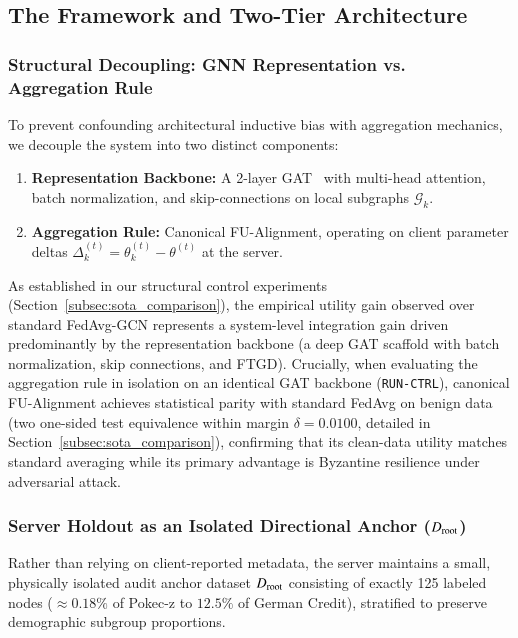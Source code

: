 \subsection{The \MethodName{} Framework and Two-Tier Architecture}
\label{subsec:framework}

\subsubsection{Structural Decoupling: GNN Representation vs. Aggregation Rule}
To prevent confounding architectural inductive bias with aggregation mechanics, we decouple the system into two distinct components:
\begin{enumerate}[leftmargin=*]
    \item \textbf{Representation Backbone:} A 2-layer GAT~\citep{velickovic2017graph} with multi-head attention, batch normalization, and skip-connections on local subgraphs $\mathcal{G}_k$.
    \item \textbf{Aggregation Rule:} Canonical FU-Alignment, operating on client parameter deltas $\Delta_k^{(t)} = \theta_k^{(t)} - \theta^{(t)}$ at the server.
\end{enumerate}
As established in our structural control experiments (Section~\ref{subsec:sota_comparison}), the empirical utility gain observed over standard FedAvg-GCN represents a system-level integration gain driven predominantly by the representation backbone (a deep GAT scaffold with batch normalization, skip connections, and FTGD). Crucially, when evaluating the aggregation rule in isolation on an identical GAT backbone (\texttt{RUN-CTRL}), canonical FU-Alignment achieves statistical parity with standard FedAvg on benign data (two one-sided test equivalence within margin $\delta = 0.0100$, detailed in Section~\ref{subsec:sota_comparison}), confirming that its clean-data utility matches standard averaging while its primary advantage is Byzantine resilience under adversarial attack.

\subsubsection{Server Holdout as an Isolated Directional Anchor (\texorpdfstring{$D_{\mathrm{root}}$}{D\_root})}
Rather than relying on client-reported metadata, the server maintains a small, physically isolated audit anchor dataset $D_{\mathrm{root}}$ consisting of exactly 125 labeled nodes ($\approx 0.18\%$ of Pokec-z to $12.5\%$ of German Credit), stratified to preserve demographic subgroup proportions. 


